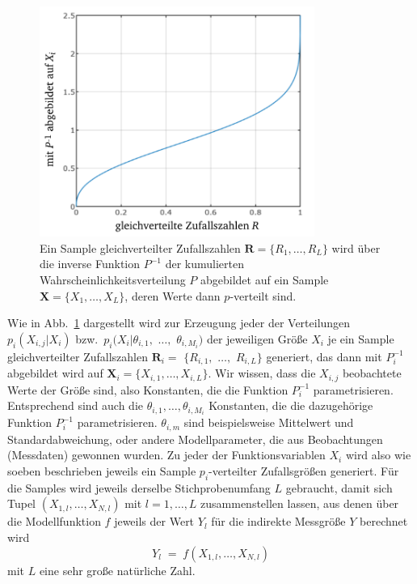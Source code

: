 \begin{figure}
\begin{center}
\includegraphics[width=90mm]{07_vorlesung/media/Zufallszahlen_abbilden_Verteilung.pdf}
\caption{\label{ZufallszahlenAbbilden} Ein Sample gleichverteilter Zufallszahlen
$\boldsymbol R = \{R_1, \dots, R_L\}$ wird über die inverse Funktion $P^{-1}$ der
kumulierten Wahrscheinlichkeitsverteilung $P$ abgebildet auf ein
Sample $\boldsymbol X = \{X_1, \dots, X_L\}$, deren Werte dann $p$-verteilt sind.}
\end{center}
\end{figure}
Wie in Abb.~\ref{ZufallszahlenAbbilden} dargestellt wird zur Erzeugung jeder der Verteilungen
$p_i (X_{i,j} | X_i)$ bzw.\ $p_i (X_i | \theta_{i,1},$ $\dots,$ $\theta_{i,M_i})$ der jeweiligen Größe
$X_i$ je ein Sample gleichverteilter Zufallszahlen $\boldsymbol R_i =$ $\{R_{i,1},$ $\dots,$ $R_{i,L}\}$ generiert, das
dann mit $P_i^{-1}$ abgebildet wird auf $\boldsymbol X_i = \{X_{i,1}, \dots, X_{i,L}\}$.
Wir wissen, dass die $X_{i,j}$ beobachtete Werte der Größe sind, also Konstanten, die die Funktion
$P_i^{-1}$ parametrisieren. Entsprechend sind auch die $\theta_{i,1}, \dots, \theta_{i,M_i}$ Konstanten, die
die dazugehörige Funktion $P_i^{-1}$ parametrisieren. $\theta_{i,m}$ sind beispielsweise Mittelwert und
Standardabweichung, oder andere Modellparameter, die aus Beobachtungen (Messdaten) gewonnen wurden.
Zu jeder der Funktionsvariablen $X_i$ wird also wie soeben beschrieben jeweils ein Sample $p_i$-verteilter
Zufallsgrößen generiert. Für die Samples wird jeweils derselbe Stichprobenumfang $L$ gebraucht, damit
sich Tupel $(X_{1,l}, \dots, X_{N,l})$ mit $l = 1,\dots, L$ zusammenstellen lassen, aus denen über die
Modellfunktion $f$ jeweils der Wert $Y_l$ für die indirekte Messgröße $Y$ berechnet wird
\begin{equation}
Y_l \; = \; f(X_{1,l}, \dots, X_{N,l})
\end{equation}
mit $L$ eine sehr große natürliche Zahl.

